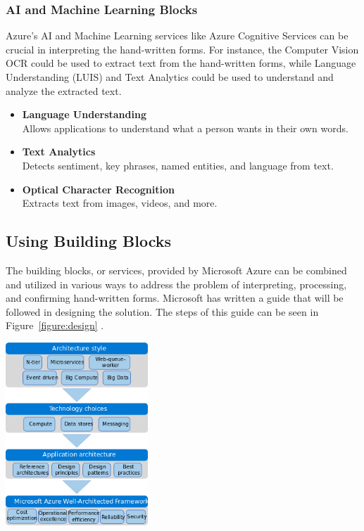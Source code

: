 \subsubsection*{AI and Machine Learning Blocks}

Azure’s AI and Machine Learning services like Azure Cognitive Services can be crucial in interpreting the hand-written forms.
For instance, the Computer Vision OCR could be used to extract text from the hand-written forms,
while Language Understanding (LUIS) and Text Analytics could be used to understand and analyze the extracted text.

\begin{itemize}
    \item \textbf{Language Understanding}
    \\ Allows applications to understand what a person wants in their own words.

    \item \textbf{Text Analytics}
    \\ Detects sentiment, key phrases, named entities, and language from text.

    \item \textbf{Optical Character Recognition}
    \\ Extracts text from images, videos, and more.
\end{itemize}

\subsection{Using Building Blocks}

The building blocks, or services,
provided by Microsoft Azure can be combined and utilized in various ways to address the problem of interpreting,
processing, and confirming hand-written forms.
Microsoft has written a guide that will be followed in designing the solution.
The steps of this guide can be seen in Figure~\ref{figure:design} \cite{Microsoft2023}.

\begin{center}
    \includegraphics[width=0.4\textwidth]{./graphics/design.png}
    \label{figure:design}
\end{center}